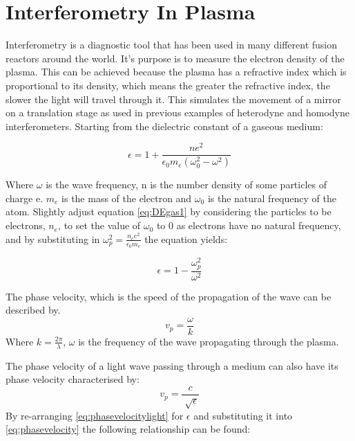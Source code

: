 \documentclass[12pt,a4paper,oneside]{report}
\begin{document}
    \section{Interferometry In Plasma}
Interferometry is a diagnostic tool that has been used in many different fusion reactors around the world. It's purpose is to measure the electron density of the plasma. This can be achieved because the plasma has a refractive index which is proportional to its density, which means the greater the refractive index, the slower the light will travel through it. This simulates the movement of a mirror on a translation stage as used in previous examples of heterodyne and homodyne interferometers. Starting from the dielectric constant of a gaseous medium:

\begin{equation}
\epsilon = 1 + \frac{ne^{2}}{\epsilon _{0} m_{e} (\omega _{0}^{2} - \omega ^{2})}
	\label{eq:DEgas1}
\end{equation}

Where $\omega$ is the wave frequency, n is the number density of some particles of charge e. $m_{e}$ is the mass of the electron and $\omega _{0}$ is the natural frequency of the atom.
Slightly adjust equation \ref{eq:DEgas1} by considering the particles to be electrons, $n_{e}$, to set the value of $\omega_{0}$ to 0 as electrons have no natural frequency, and by substituting in $\omega _{p}^{2} = \frac{n_{e}e^{2}}{\epsilon _{0} m_{e}}$ the equation yields:

\begin{equation}
\epsilon = 1 - \frac{\omega _{p}^{2}}{\omega ^{2}}
	\label{eq:DEgas2}
\end{equation}

The phase velocity, which is the speed of the propagation of the wave can be described by.
\begin{equation}
v_{p} = \frac{\omega}{k}
	\label{eq:phasevelocity}
\end{equation}
Where $k = \frac{2\pi}{\lambda}$, $\omega$ is the frequency of the wave propagating through the plasma.

The phase velocity of a light wave passing through a medium can also have its phase velocity characterised by:
\begin{equation}
v_{p} = \frac{c}{\sqrt[]{\epsilon}}
	\label{eq:phasevelocitylight}
\end{equation}
By re-arranging \ref{eq:phasevelocitylight} for $\epsilon$ and substituting it into \ref{eq:phasevelocity} the following relationship can be found:
\end{document}
